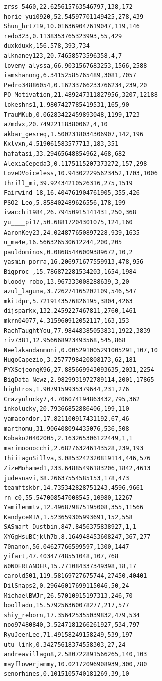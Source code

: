 \begin{verbatim}
zrss_5460,22.625615763546797,138,172
horie_yui0920,52.54597701149425,278,439
Shun_hrt719,10.016369047619047,119,146
redo323,0.1138353765323993,55,429
duxkduxk,156.578,393,734
alknaney123,20.74658573596358,4,7
lovemy_alyssa,66.9031567683253,1566,2588
iamshanong,6.34152585765489,3081,7057
Pedro34886054,0.16233766233766234,239,20
PO_Motivation,21.489247311827956,3207,12188
lokeshns1,1.9807427785419531,165,90
TrauMKub,0.06283422459893048,1199,1723
a7mdvx,20.74922118380062,4,10
akbar_gesreq,1.5002318034306907,142,196
Kxlvxn,4.519061583577713,183,351
hafatasi,33.29465648854962,468,682
AlexiaCepeda3,0.1175115207373272,157,298
LoveDVoiceless,10.943022295623452,1703,1006
thrill_mi,39.92434210526316,275,1519
Fairwind_18,16.404761904761905,355,426
PSO2_Leo,5.858402489626556,178,199
iwacchi1984,26.79450915141431,250,368
yu____pi17,50.68817204301075,124,160
AaronKey23,24.024877650897228,939,1635
u_ma4e,16.566326530612244,200,205
pauldominos,0.08685446009389672,10,2
yasmin_porra,16.206971677559913,478,956
Bigproc_,15.786872281534203,1654,1984
bloody_robo,13.967333008288639,3,20
azul_laguna,3.726274165202109,546,547
mkitdpr,5.7219143576826195,3804,4263
dijsparkx,132.2459227467811,2760,1461
mkrn04077,4.315960912052117,163,153
RachTaughtYou,77.98448385053831,1922,3839
riv7381,12.956668923493568,545,868
Neelakandanmoni,0.005291005291005291,107,10
HugoCapezio,3.2577798420808173,62,181
PYXSejeongK96,27.885669943093635,2031,2254
BigData_Newz,2.9829931972789114,2001,17865
hightros,1.9079159935379644,231,276
Crazynlucky7,4.706074194863432,795,362
inkolucky,20.79366852886406,199,110
yamacondor,17.821100917431192,67,46
marthomu,31.906408094435076,536,508
Kobako20402005,2.163265306122449,1,1
marimoooocchi,2.682763246143528,239,193
ThiiiagoSillva,3.0853242320819114,446,576
ZizeMohamed1,233.64885496183206,1842,4613
judesnavi,38.26637554585153,178,473
teamftskbr,14.735342828751243,4596,9661
rn_c0,55.547008547008545,10980,12267
Yamilemmtv,12.496879875195008,355,11566
KandyceMIA,1.523659305993691,152,558
SASmart_Dustbin,847.8456375838927,1,1
XYGgHsuBCjklh7b,8.164948453608247,367,277
70nanon,56.04627766599597,1300,1447
yifart,47.40347748551048,107,768
W0NDERLANDER,15.771084337349398,18,17
carold501,119.58169727675744,27450,40401
DilSnaps2,0.29646017699115046,50,24
MichaelBWJr,26.57010915197313,246,70
boollado,15.579256360078277,217,577
shiy_reborn,17.356425355039832,479,534
noo97480840,3.5247181266261927,534,797
RyuJeenLee,71.49158249158249,539,197
utu_link,0.34275618374558303,27,24
andreavillago8,2.580722891566265,140,103
mayflowerjammy,10.02172096908939,300,780
senorhines,0.1015105740181269,39,10

\end{verbatim}
